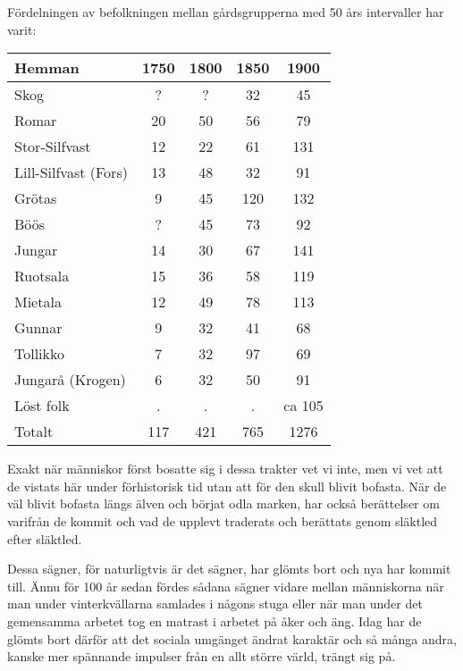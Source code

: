 Fördelningen av befolkningen mellan gårdsgrupperna med 50 års intervaller har varit:

\begin{center}
  \begin{tabular}{lcccc}
    \hline
    Hemman & 1750 & 1800 & 1850 & 1900 \\ \hline
    Skog & ? & ? & 32 & 45 \\
    Romar & 20 & 50 & 56 & 79 \\
    Stor-Silfvast & 12 & 22 & 61 & 131 \\
    Lill-Silfvast (Fors) & 13 & 48 & 32 & 91 \\
    Grötas & 9 & 45 & 120 & 132 \\
    Böös & ? & 45 & 73 & 92 \\
    Jungar & 14 & 30 & 67 & 141 \\
    Ruotsala & 15 & 36 & 58 & 119 \\
    Mietala & 12 & 49 & 78 & 113 \\
    Gunnar & 9 & 32 & 41 & 68 \\
    Tollikko & 7 & 32 & 97 & 69 \\
    Jungarå (Krogen) & 6 & 32 & 50 & 91 \\
    Löst folk & . & . & . & ca 105 \\ \hline
    Totalt & 117 & 421 & 765 & 1276 \\
    \hline
  \end{tabular}
\end{center}

%

Exakt när människor först bosatte sig i dessa trakter vet vi inte, men vi vet att de vistats här under förhistorisk tid utan att för den skull blivit bofasta. När de väl blivit bofasta längs älven och börjat odla marken, har också berättelser om varifrån de kommit och vad de upplevt traderats och berättats genom släktled efter släktled.

Dessa sägner, för naturligtvis är det sägner, har glömts bort och nya har kommit till. Ännu för 100 år sedan fördes sådana sägner vidare mellan människorna när man under vinterkvällarna samlades i någons stuga eller när man under det gemensamma arbetet tog en matrast i arbetet på åker och äng. Idag har de glömts bort därför att det sociala umgänget ändrat karaktär och så många andra, kanske mer spännande impulser från en allt större värld, trängt sig på.
